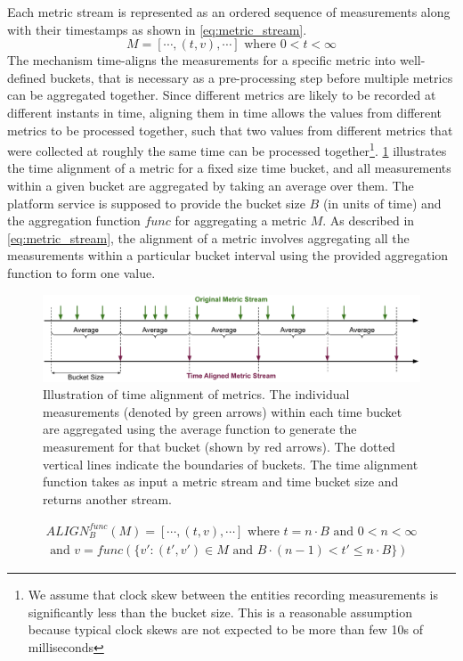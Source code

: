 \begin{itemize}
Each metric stream is represented as an ordered sequence of measurements along with their timestamps as shown in \cref{eq:metric_stream}.
\begin{equation}
M = \left[ \cdots , \left( t, v \right) , \cdots \right] \text{ where } 0 < t < \infty
\label{eq:metric_stream}
\end{equation}
The mechanism time-aligns the measurements for a specific metric into well-defined buckets, that is necessary as a pre-processing step before multiple metrics can be aggregated together. Since different metrics are likely to be recorded at different instants in time, aligning them in time allows the values from different metrics to be processed together, such that two values from different metrics that were collected at roughly the same time can be processed together\footnote{We assume that clock skew between the entities recording measurements is significantly less than the bucket size. This is a reasonable assumption because typical clock skews are not expected to be more than few 10s of milliseconds}. \cref{fig:time_alignment} illustrates the time alignment of a metric for a fixed size time bucket, and all measurements within a given bucket are aggregated by taking an average over them. The platform service is supposed to provide the bucket size $B$ (in units of time) and the aggregation function $func$ for aggregating a metric $M$. As described in \cref{eq:metric_stream}, the alignment of a metric involves aggregating all the measurements within a particular bucket interval using the provided aggregation function to form one value.
\begin{figure}
\centering
\includegraphics[width=\linewidth]{figures/mechanisms/monitoring/time_alignment}
\caption{Illustration of time alignment of metrics. The individual measurements (denoted by green arrows) within each time bucket are aggregated using the average function to generate the measurement for that bucket (shown by red arrows). The dotted vertical lines indicate the boundaries of buckets. The time alignment function takes as input a metric stream and time bucket size and returns another stream.}
\label{fig:time_alignment}
\end{figure}
\begin{multline}
ALIGN^{func}_{B} \left( M \right) = \left[ \cdots , \left( t, v \right) , \cdots \right] \text{ where } t = n\cdot B \text{ and } 0 < n < \infty \\ \text{ and } v = func \left( \{ v' : \left( t', v'\right) \in M \text{ and } B\cdot \left( n-1\right) < t' \leq n \cdot B \} \right)
\label{eq:metric_stream}
\end{multline}


\end{itemize}
